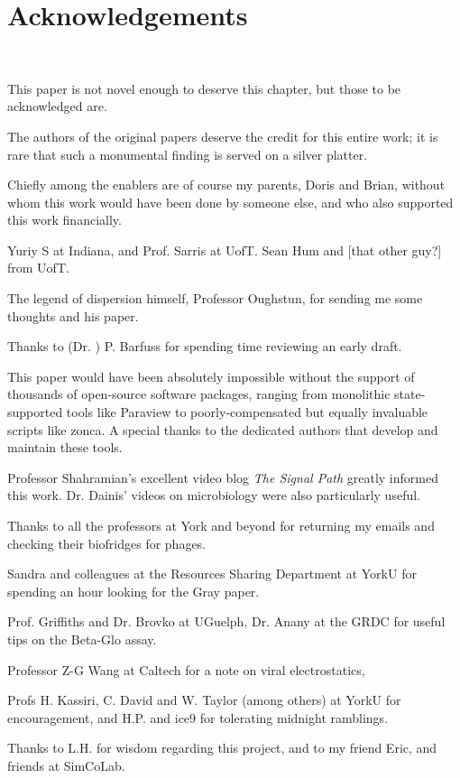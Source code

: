 \documentclass[paper.tex]{subfiles}
\begin{document}
	
\clearpage
\section{Acknowledgements}\

This paper is not novel enough to deserve this chapter, but those to be acknowledged are.

The authors of the original papers deserve the credit for this entire work; it is rare that such a monumental finding is served on a silver platter.

Chiefly among the enablers are of course my parents, Doris and Brian, without whom this work would have been done by someone else, and who also supported this work financially. 

Yuriy S at Indiana, and Prof. Sarris at UofT. Sean Hum and [that other guy?] from UofT.

The legend of dispersion himself, Professor Oughstun, for sending me some thoughts and his paper.

Thanks to (Dr. ) P. Barfuss for spending time reviewing an early draft.

This paper would have been absolutely impossible without the support of thousands of open-source software packages, ranging from monolithic state-supported tools like Paraview to poorly-compensated but equally invaluable scripts like zonca. A special thanks to the dedicated authors that develop and maintain these tools.

Professor Shahramian's excellent video blog {\it The Signal Path} greatly informed this work. Dr. Dainis' videos on microbiology were also particularly useful.

Thanks to all the professors at York and beyond for returning my emails and checking their biofridges for phages.

Sandra and colleagues at the Resources Sharing Department at YorkU for spending an hour looking for 
the Gray paper.

Prof. Griffiths and Dr. Brovko at UGuelph, Dr. Anany at the GRDC for useful tips on the Beta-Glo assay.

Professor Z-G Wang at Caltech for a note on viral electrostatics, 

Profs H. Kassiri, C. David and W. Taylor (among others) at YorkU for encouragement, and H.P. and ice9 for tolerating midnight ramblings.

Thanks to L.H. for wisdom regarding this project, and to my friend Eric, and friends at SimCoLab.
\end{document}
